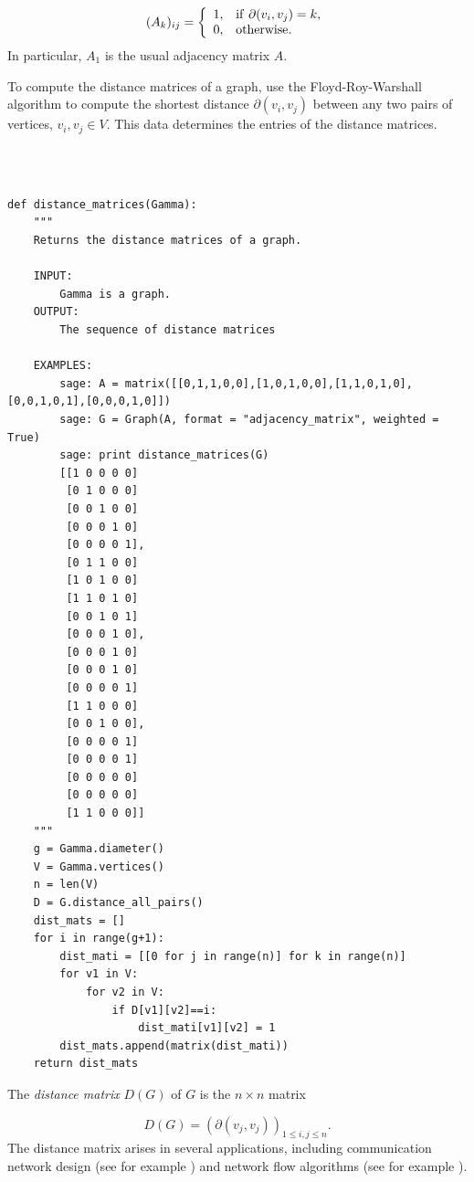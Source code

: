 \[
(A_k)_{ij} = 
\left\{
\begin{array}{ll}
1,& {\rm if}\ \partial(v_i,v_j)=k,\\
0,& {\rm otherwise}.
\end{array}
\right.
\]
In particular, $A_1$ is the usual adjacency matrix $A$.

To compute the distance matrices of a graph, use the Floyd-Roy-Warshall
algorithm to compute the shortest distance 
$\partial(v_i,v_j)$ between any two pairs of vertices,
$v_i,v_j\in V$. This data determines the entries of
the distance matrices.

%
\begin{center}
\fontsize{9pt}{9pt}
\selectfont
\tt
\begin{lstlisting}

def distance_matrices(Gamma):
    """
    Returns the distance matrices of a graph.

    INPUT:
        Gamma is a graph.
    OUTPUT:
        The sequence of distance matrices

    EXAMPLES:
        sage: A = matrix([[0,1,1,0,0],[1,0,1,0,0],[1,1,0,1,0],[0,0,1,0,1],[0,0,0,1,0]])
        sage: G = Graph(A, format = "adjacency_matrix", weighted = True)
        sage: print distance_matrices(G)
        [[1 0 0 0 0]
         [0 1 0 0 0]
         [0 0 1 0 0]
         [0 0 0 1 0]
         [0 0 0 0 1], 
         [0 1 1 0 0]
         [1 0 1 0 0]
         [1 1 0 1 0]
         [0 0 1 0 1]
         [0 0 0 1 0],
         [0 0 0 1 0]
         [0 0 0 1 0]
         [0 0 0 0 1]
         [1 1 0 0 0]
         [0 0 1 0 0],
         [0 0 0 0 1]
         [0 0 0 0 1]
         [0 0 0 0 0]
         [0 0 0 0 0]
         [1 1 0 0 0]]
    """
    g = Gamma.diameter()
    V = Gamma.vertices()
    n = len(V)
    D = G.distance_all_pairs()
    dist_mats = []
    for i in range(g+1):
        dist_mati = [[0 for j in range(n)] for k in range(n)]
        for v1 in V:
            for v2 in V:
                if D[v1][v2]==i:
                    dist_mati[v1][v2] = 1
        dist_mats.append(matrix(dist_mati))
    return dist_mats

\end{lstlisting}
\end{center}
%

The {\it distance matrix} $D(G)$ of $G$ is
the $n\times n$ matrix

\[
D(G)=(\partial(v_j,v_j))_{1\leq i,j\leq n}.
\]
The distance matrix arises in several applications, including
communication network design (see for example
\cite{GrahamPollak1971})
and network flow algorithms (see for example \cite{Dijkstra1959}).

